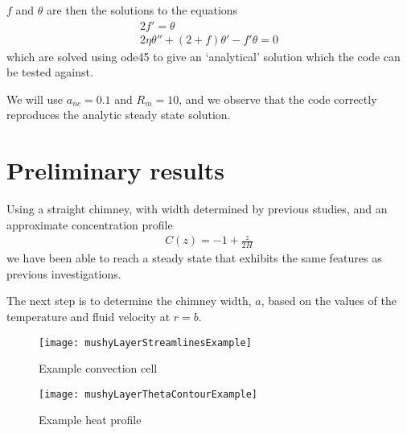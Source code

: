 \documentclass{article}
\begin{document}
$f$ and $\theta$ are then the solutions to the equations
\begin{eqnarray}
2f' = \theta \\
2 \eta \theta'' + (2+f) \theta' - f' \theta = 0
\end{eqnarray}
which are solved using ode45 to give an `analytical' solution which the code can be tested against.

We will use $a_{nc} = 0.1$ and $R_m = 10$, and we observe that the code correctly reproduces the analytic steady state solution.

\section{Preliminary results}
Using a straight chimney, with width determined by previous studies, and an approximate concentration profile
\begin{eqnarray}
C(z) = -1 + \frac{z}{2 H}
\end{eqnarray}
we have been able to reach a steady state that exhibits the same features as previous investigations.

The next step is to determine the chimney width, $a$, based on the values of the temperature and fluid velocity at $r=b$.

\begin{figure}[ht!]
    \centering
    \texttt{[image: mushyLayerStreamlinesExample]}
     \label{fig:streamlines}
     \caption{Example convection cell}
 \end{figure}
 
 \begin{figure}[ht!]
    \centering
    \texttt{[image: mushyLayerThetaContourExample]}
     \label{fig:contours}
     \caption{Example heat profile}
 \end{figure}
\end{document}
